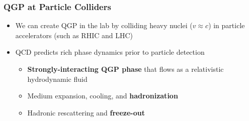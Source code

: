 \begin{frame}
  \frametitle{\textbf{QGP at Particle Colliders}}
  \begin{itemize}
  \item We can create QGP in the lab by colliding heavy nuclei ($v \approx c$) in particle accelerators (such as RHIC and LHC)
  \item QCD predicts rich phase dynamics prior to particle detection
    \begin{itemize}
    \item \textbf{Strongly-interacting QGP phase} that flows as a relativistic hydrodynamic fluid
    \item Medium expansion, cooling, and \textbf{hadronization}
    \item Hadronic rescattering and \textbf{freeze-out}
    \end{itemize}
  \end{itemize}

  \
  
  \centering
\end{frame}
